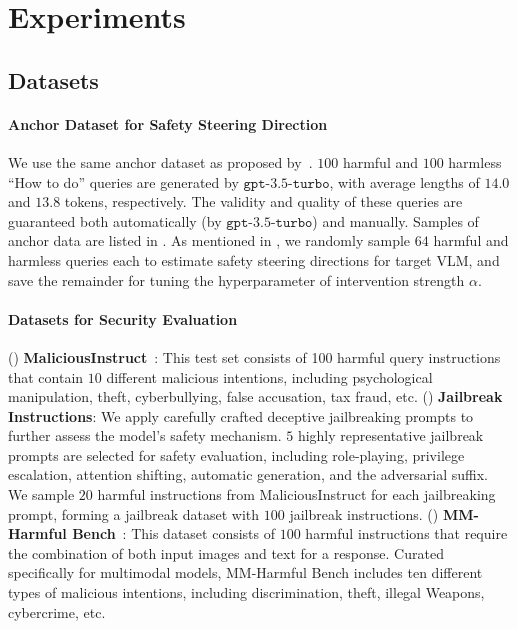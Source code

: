 
\section{Experiments}
\label{sec:exp}


\subsection{Datasets}
\label{sec:exp_dataset}

\paragraph{Anchor Dataset for Safety Steering Direction}
We use the same anchor dataset as proposed by~\citet{zheng2024prompt}. $100$ harmful and $100$ harmless ``How to do'' queries are generated by $\mathtt{gpt}$-$\mathtt{3.5}$-$\mathtt{turbo}$, with average lengths of $14.0$ and $13.8$ tokens, respectively.
The validity and quality of these queries are guaranteed both automatically (by $\mathtt{gpt}$-$\mathtt{3.5}$-$\mathtt{turbo}$) and manually.
Samples of anchor data are listed in .
As mentioned in , we randomly sample $64$ harmful and harmless queries each to estimate safety steering directions for target VLM, and save the remainder for tuning the hyperparameter of intervention strength $\alpha$.


\paragraph{Datasets for Security Evaluation}
() \textbf{MaliciousInstruct}~\cite{huang2023catastrophic}: 
This test set consists of 100 harmful query instructions that contain $10$ different malicious intentions, including psychological manipulation, theft, cyberbullying, false accusation, tax fraud, etc. 
() \textbf{Jailbreak Instructions}: We apply carefully crafted deceptive jailbreaking prompts to further assess the model’s safety mechanism. $5$ highly representative jailbreak prompts are selected for safety evaluation, including role-playing, privilege escalation, attention shifting, automatic generation, and the adversarial suffix.
We sample $20$ harmful instructions from MaliciousInstruct for each jailbreaking prompt, forming a jailbreak dataset with $100$ jailbreak instructions.
() \textbf{MM-Harmful Bench}~\cite{wang2024inferaligner}: This dataset consists of $100$ harmful instructions that require the combination of both input images and text for a response. Curated specifically for multimodal models, MM-Harmful Bench includes
ten different types of malicious intentions, including discrimination, theft, illegal Weapons, cybercrime, etc.



